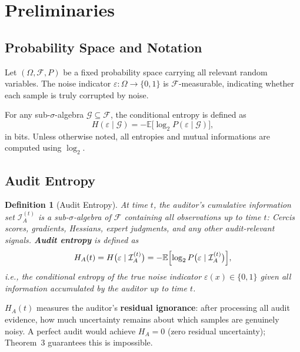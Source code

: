 \documentclass[12pt,a4paper]{article}
\newtheorem{definition}[theorem]{Definition}
\newcommand{\cI}{\mathcal{I}}
\begin{document}
\section{Preliminaries}

\subsection{Probability Space and Notation}

Let $(\Omega, \mathcal{F}, P)$ be a fixed probability space carrying all relevant random variables. The noise indicator $\varepsilon: \Omega \to \{0,1\}$ is $\mathcal{F}$-measurable, indicating whether each sample is truly corrupted by noise.

For any sub-$\sigma$-algebra $\mathcal{G} \subseteq \mathcal{F}$, the conditional entropy is defined as
\[
H(\varepsilon \mid \mathcal{G}) = -\mathbb{E}\bigl[\log_2 P(\varepsilon \mid \mathcal{G})\bigr],
\]
in bits. Unless otherwise noted, all entropies and mutual informations are computed using $\log_2$.

\subsection{Audit Entropy}

\begin{definition}[Audit Entropy]
\label{def:audit-entropy}
At time $t$, the auditor's cumulative information set $\cI_A^{(t)}$ is a sub-$\sigma$-algebra of $\mathcal{F}$ containing all observations up to time $t$: Cercis scores, gradients, Hessians, expert judgments, and any other audit-relevant signals.
\textbf{Audit entropy} is defined as
\begin{equation}\label{eq:H-A-def}
    H_A(t) = H\bigl(\varepsilon \mid \cI_A^{(t)}\bigr)
    = -\mathbb{E}\Bigl[\log_2 P\bigl(\varepsilon \mid \cI_A^{(t)}\bigr)\Bigr],
\end{equation}
i.e., the conditional entropy of the true noise indicator $\varepsilon(x)\in\{0,1\}$ given all information accumulated by the auditor up to time $t$.
\end{definition}

$H_A(t)$ measures the auditor's \textbf{residual ignorance}: after processing all audit evidence, how much uncertainty remains about which samples are genuinely noisy. A perfect audit would achieve $H_A=0$ (zero residual uncertainty); Theorem~3 guarantees this is impossible.
\end{document}
